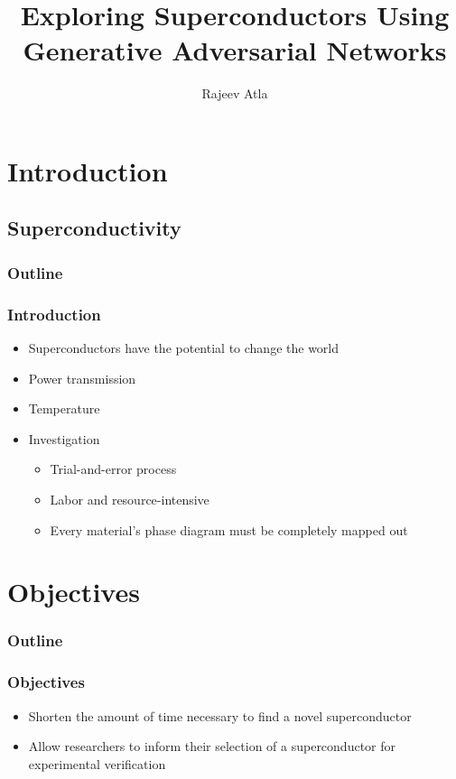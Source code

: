 \documentclass[12pt]{beamer}
\title{Exploring Superconductors Using Generative Adversarial Networks}
\author[Rajeev Atla]
{Rajeev Atla}
\institute[JPS]
{
  John P. Stevens High School
}
\begin{document}
\frame{\titlepage}



\section{Introduction}
\subsection{Superconductivity}

\begin{frame}
\frametitle{Outline}
\tableofcontents[currentsection]
\end{frame}



\begin{frame}
\frametitle{Introduction}
\begin{itemize}
  \pause
  \item Superconductors have the potential to change the world
  \pause
  \item Power transmission
  \pause
  \item Temperature
  \pause
  \item Investigation
  \pause
  \begin{itemize}
      \item Trial-and-error process
      \pause
      \item Labor and resource-intensive
      \pause
      \item Every material's phase diagram must be completely mapped out
  \end{itemize}
\end{itemize}
\end{frame}





\section{Objectives}
\begin{frame}
\frametitle{Outline}
\tableofcontents[currentsection]
\end{frame}

\begin{frame}
\frametitle{Objectives}

\begin{itemize}
    \item Shorten the amount of time necessary to find a novel superconductor
    \pause
    \item Allow researchers to inform their selection of a superconductor for experimental verification
\end{itemize}

\end{frame}
\end{document}
